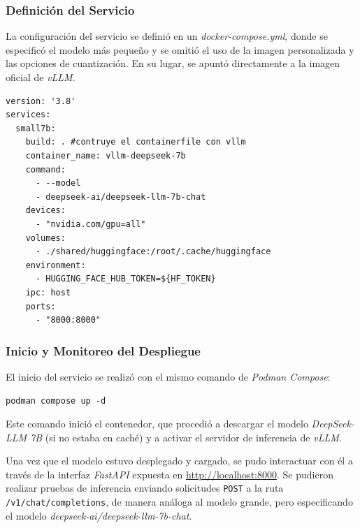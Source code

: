 \subsubsection{Definición del Servicio}
La configuración del servicio se definió en un \textit{docker-compose.yml}, donde se especificó el modelo más pequeño y se omitió el uso de la imagen personalizada y las opciones de cuantización. En su lugar, se apuntó directamente a la imagen oficial de \textit{vLLM}.
\newpage
\begin{verbatim}
version: '3.8'
services:
  small7b:
    build: . #contruye el containerfile con vllm
    container_name: vllm-deepseek-7b
    command:
      - --model
      - deepseek-ai/deepseek-llm-7b-chat
    devices:
      - "nvidia.com/gpu=all"
    volumes:
      - ./shared/huggingface:/root/.cache/huggingface
    environment:
      - HUGGING_FACE_HUB_TOKEN=${HF_TOKEN}
    ipc: host
    ports:
      - "8000:8000"
\end{verbatim}

\subsubsection{Inicio y Monitoreo del Despliegue}
El inicio del servicio se realizó con el mismo comando de \textit{Podman Compose}:
\begin{verbatim}
podman compose up -d
\end{verbatim}

Este comando inició el contenedor, que procedió a descargar el modelo \textit{DeepSeek-LLM 7B} (si no estaba en caché) y a activar el servidor de inferencia de \textit{vLLM}.

Una vez que el modelo estuvo desplegado y cargado, se pudo interactuar con él a través de la interfaz \textit{FastAPI} expuesta en \url{http://localhost:8000}. Se pudieron realizar pruebas de inferencia enviando solicitudes \texttt{POST} a la ruta \texttt{/v1/chat/completions}, de manera análoga al modelo grande, pero especificando el modelo \textit{deepseek-ai/deepseek-llm-7b-chat}.

